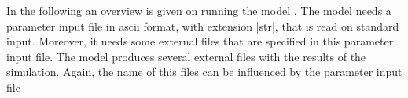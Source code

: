 
In the following an overview is given on running the model \shy{}. The
model needs a parameter input file in ascii format, with extension |str|,
that is read on standard input. Moreover, it needs some external files
that are specified in this parameter input file. The model produces
several external files with the results of the simulation. Again, the
name of this files can be influenced by the parameter input file

